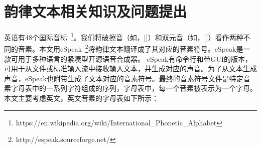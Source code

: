 \begin{table}[h]
  \centering
  \caption{说唱歌词样例及其对应的韵律形式}
  \label{tab:example}%
\end{table}%

\section{韵律文本相关知识及问题提出}
英语有48个国际音标~\footnote{https://en.wikipedia.org/wiki/International\_Phonetic\_Alphabet}。我们将破擦音（如，[\textteshlig]）和双元音（如，[\textopeno\textsci]）看作两种不同的音素。本文用eSpeak~\footnote{http://espeak.sourceforge.net/}将韵律文本翻译成了其对应的音素符号。eSpeak是一款可用于多种语言的紧凑型开源语音合成器。 eSpeak有命令行和带GUI的版本，可用于从文件或标准输入流中接收输入文本，并生成对应的声音。为了从文本生成声音，eSpeak也附带生成了文本对应的音素符号。最终的音素符号文件是特定音素字母表中的一系列字符组成的序列，字母表中，每一个音素被表示为一个字母。本文主要考虑英文，英文音素的字母表如下所示：

